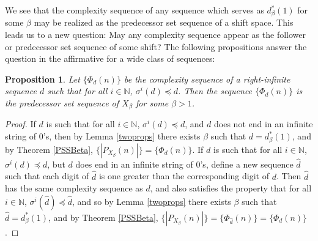 \documentclass{amsart}
\newtheorem{proposition}[theorem]{Proposition}
\theoremstyle{definition}
\numberwithin{equation}{section}
\begin{document}
We see that the complexity sequence of any sequence which serves as $d_\beta^* (1)$ for some $\beta$ may be realized as the predecessor set sequence of a shift space. This leads us to a new question: May any complexity sequence appear as the follower or predecessor set sequence of some shift? The following propositions answer the question in the affirmative for a wide class of sequences:

\begin{proposition}\label{achievable}
Let $\{\Phi_d(n)\}$ be the complexity sequence of a right-infinite sequence $d$ such that for all $i \in \mathbb{N}$, $\sigma^i(d) \preceq d$. Then the sequence $\{\Phi_d(n)\}$ is the predecessor set sequence of $X_\beta$ for some $\beta > 1$.
\end{proposition}

\begin{proof} 
If $d$ is such that for all $i \in \mathbb{N}$, $\sigma^i(d) \preceq d$, and $d$ does not end in an infinite string of 0's, then by Lemma \ref{twoprops} there exists $\beta$ such that $d = d_\beta^*(1)$, and by Theorem \ref{PSSBeta}, $\{|P_{X_\beta}(n)|\} = \{\Phi_d(n)\}$. If $d$ is such that for all $i \in \mathbb{N}$, $\sigma^i(d) \preceq d$, but $d$ does end in an infinite string of 0's, define a new sequence $\hat{d}$ such that each digit of $\hat{d}$ is one greater than the corresponding digit of $d$. Then $\hat{d}$ has the same complexity sequence as $d$, and also satisfies the property that for all $i \in \mathbb{N}$, $\sigma^i(\hat{d}) \preceq \hat{d}$, and so by Lemma \ref{twoprops} there exists $\beta$ such that $\hat{d} = d_\beta^*(1)$, and by Theorem \ref{PSSBeta}, $\{|P_{X_\beta}(n)|\} = \{\Phi_{\hat{d}}(n)\} = \{\Phi_d(n)\}$.
\end{proof}
\end{document}
